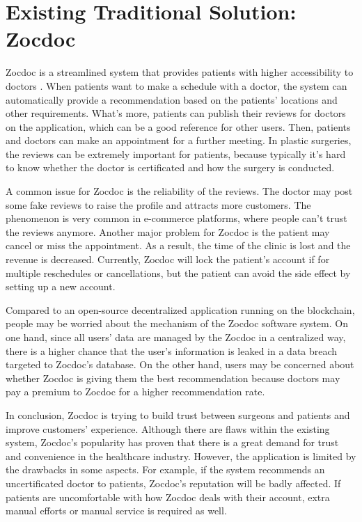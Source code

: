 \documentclass{article}
\begin{document}
\section{Existing Traditional Solution: Zocdoc}
Zocdoc is a streamlined system that provides patients with higher accessibility to doctors \cite{zocdoc}. When patients want to make a schedule with a doctor, the system can automatically provide a recommendation based on the patients' locations and other requirements. What's more, patients can publish their reviews for doctors on the application, which can be a good reference for other users. Then, patients and doctors can make an appointment for a further meeting. In plastic surgeries, the reviews can be extremely important for patients, because typically it's hard to know whether the doctor is certificated and how the surgery is conducted.
\par A common issue for Zocdoc is the reliability of the reviews. The doctor may post some fake reviews to raise the profile and attracts more customers. The phenomenon is very common in e-commerce platforms, where people can't trust the reviews anymore. Another major problem for Zocdoc is the patient may cancel or miss the appointment. As a result, the time of the clinic is lost and the revenue is decreased. Currently, Zocdoc will lock the patient's account if for multiple reschedules or cancellations, but the patient can avoid the side effect by setting up a new account. 
\par Compared to an open-source decentralized application running on the blockchain, people may be worried about the mechanism of the Zocdoc software system. On one hand, since all users' data are managed by the Zocdoc in a centralized way, there is a higher chance that the user's information is leaked in a data breach targeted to Zocdoc's database. On the other hand, users may be concerned about whether Zocdoc is giving them the best recommendation because doctors may pay a premium to Zocdoc for a higher recommendation rate. 
\par In conclusion, Zocdoc is trying to build trust between surgeons and patients and improve customers' experience. Although there are flaws within the existing system, Zocdoc's popularity has proven that there is a great demand for trust and convenience in the healthcare industry. However, the application is limited by the drawbacks in some aspects. For example, if the system recommends an uncertificated doctor to patients, Zocdoc's reputation will be badly affected. If patients are uncomfortable with how Zocdoc deals with their account, extra manual efforts or manual service is required as well.
\end{document}
